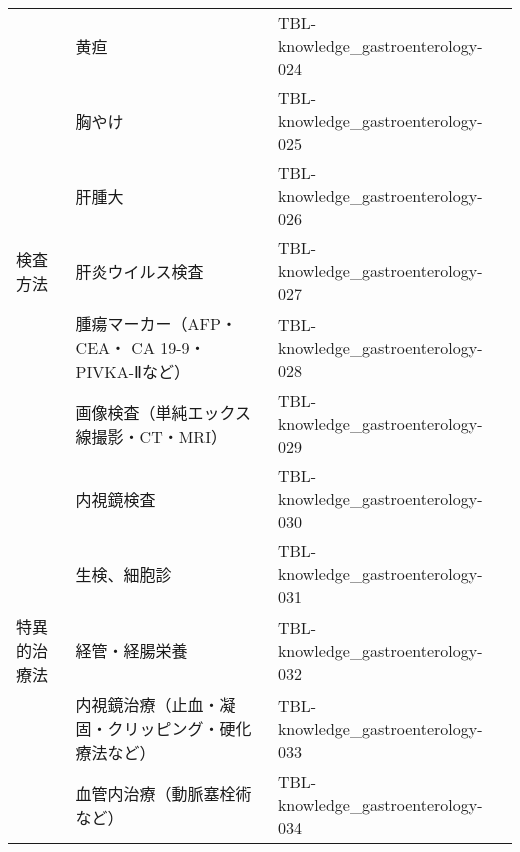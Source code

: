 \begin{xltabular}{\linewidth}{XXX}
 & 黄疸 & TBL-knowledge_gastroenterology-024 \\
 & 胸やけ & TBL-knowledge_gastroenterology-025 \\
 & 肝腫大 & TBL-knowledge_gastroenterology-026 \\
検査方法 & 肝炎ウイルス検査 & TBL-knowledge_gastroenterology-027 \\
 & 腫瘍マーカー（AFP・ CEA・ CA 19-9・ PIVKA-Ⅱなど） & TBL-knowledge_gastroenterology-028 \\
 & 画像検査（単純エックス線撮影・CT・MRI） & TBL-knowledge_gastroenterology-029 \\
 & 内視鏡検査 & TBL-knowledge_gastroenterology-030 \\
 & 生検、細胞診 & TBL-knowledge_gastroenterology-031 \\
特異的治療法 & 経管・経腸栄養 & TBL-knowledge_gastroenterology-032 \\
 & 内視鏡治療（止血・凝固・クリッピング・硬化療法など） & TBL-knowledge_gastroenterology-033 \\
 & 血管内治療（動脈塞栓術など） & TBL-knowledge_gastroenterology-034 \\
\bottomrule
\end{xltabular}

